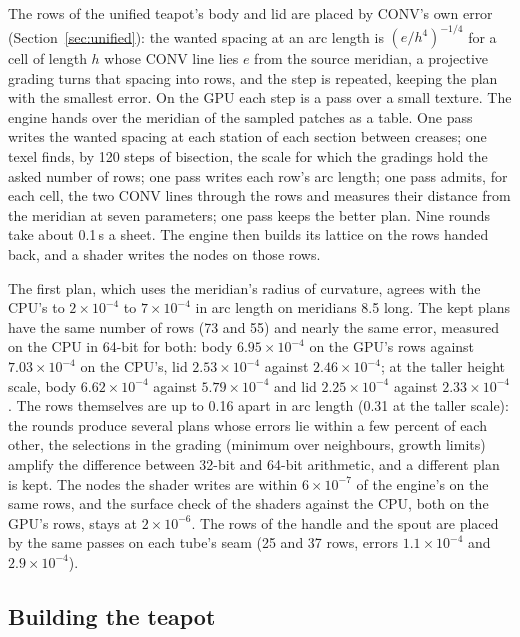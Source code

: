 \documentclass[journal]{IEEEtran}
\begin{document}
The rows of the unified teapot's body and lid are placed by CONV's own
error (Section~\ref{sec:unified}): the wanted spacing at an arc length
is $(e/h^4)^{-1/4}$ for a cell of length $h$ whose CONV line lies $e$
from the source meridian, a projective grading turns that spacing into
rows, and the step is repeated, keeping the plan with the smallest
error. On the GPU each step is a pass over a small texture. The engine
hands over the meridian of the sampled patches as a table. One pass
writes the wanted spacing at each station of each section between
creases; one texel finds, by 120 steps of bisection, the scale for which
the gradings hold the asked number of rows; one pass writes each row's
arc length; one pass admits, for each cell, the two CONV lines through
the rows and measures their distance from the meridian at seven
parameters; one pass keeps the better plan. Nine rounds take about
0.1\,s a sheet. The engine then builds its lattice on the rows handed
back, and a shader writes the nodes on those rows.

The first plan, which uses the meridian's radius of curvature, agrees
with the CPU's to $2\times10^{-4}$ to $7\times10^{-4}$ in arc length on
meridians 8.5 long. The kept plans have the same number of rows (73 and
55) and nearly the same error, measured on the CPU in 64-bit for both:
body $6.95\times10^{-4}$ on the GPU's rows against $7.03\times10^{-4}$
on the CPU's, lid $2.53\times10^{-4}$ against $2.46\times10^{-4}$; at
the taller height scale, body $6.62\times10^{-4}$ against
$5.79\times10^{-4}$ and lid $2.25\times10^{-4}$ against
$2.33\times10^{-4}$. The rows themselves are up to 0.16 apart in arc
length (0.31 at the taller scale): the rounds produce several plans
whose errors lie within a few percent of each other, the selections in
the grading (minimum over neighbours, growth limits) amplify the
difference between 32-bit and 64-bit arithmetic, and a different plan is
kept. The nodes the shader writes are within $6\times10^{-7}$ of the
engine's on the same rows, and the surface check of the shaders against
the CPU, both on the GPU's rows, stays at $2\times10^{-6}$. The rows of
the handle and the spout are placed by the same passes on each tube's
seam (25 and 37 rows, errors $1.1\times10^{-4}$ and
$2.9\times10^{-4}$).

\subsection{Building the teapot}
\end{document}
